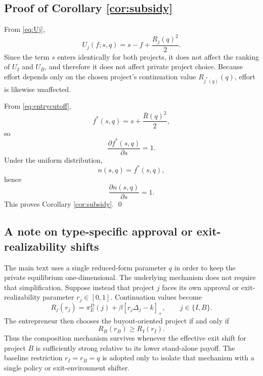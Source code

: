 \subsection{Proof of Corollary \ref{cor:subsidy}}

From \eqref{eq:Uj},
\begin{equation}
    U_j(f;s,q)=s-f+\frac{R_j(q)^2}{2}.
\end{equation}
Since the term \(s\) enters identically for both projects, it does not affect the ranking of \(U_I\) and \(U_B\), and therefore it does not affect private project choice.
Because effort depends only on the chosen project's continuation value \(R_{j^*(q)}(q)\), effort is likewise unaffected.

From \eqref{eq:entrycutoff},
\begin{equation}
    f^*(s,q)=s+\frac{\bar R(q)^2}{2},
\end{equation}
so
\begin{equation}
    \frac{\partial f^*(s,q)}{\partial s}=1.
\end{equation}
Under the uniform distribution,
\begin{equation}
    n(s,q)=f^*(s,q),
\end{equation}
hence
\begin{equation}
    \frac{\partial n(s,q)}{\partial s}=1.
\end{equation}
This proves Corollary \ref{cor:subsidy}. \qed

\subsection{A note on type-specific approval or exit-realizability shifts}\label{app:typespecificq}

The main text uses a single reduced-form parameter \(q\) in order to keep the private equilibrium one-dimensional.
The underlying mechanism does not require that simplification.
Suppose instead that project \(j\) faces its own approval or exit-realizability parameter \(r_j\in[0,1]\).
Continuation values become
\begin{equation}
    R_j(r_j)=\pi_E^D(j)+\beta[r_j\Delta_j-k]_+,
    \qquad j\in\{I,B\}.
\end{equation}
The entrepreneur then chooses the buyout-oriented project if and only if
\begin{equation}
    R_B(r_B)\ge R_I(r_I).
\end{equation}
Thus the composition mechanism survives whenever the effective exit shift for project \(B\) is sufficiently strong relative to its lower stand-alone payoff.
The baseline restriction \(r_I=r_B=q\) is adopted only to isolate that mechanism with a single policy or exit-environment shifter.

